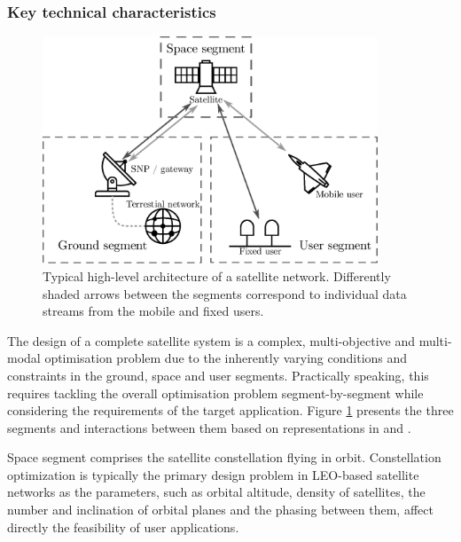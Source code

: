 \documentclass[english, 12pt, a4paper, elec, utf8, a-1b, online]{aaltothesis}
\begin{document}
\subsubsection{Key technical characteristics} \label{ch-constellation-characteristics}

\begin{figure}[h]
  \centering
  \includegraphics[width=100mm]{figures/fig-constellation-segments.eps}
  \caption{Typical high-level architecture of a satellite network. Differently shaded arrows between the segments correspond to individual data streams from the mobile and fixed users.}
  \label{fig-constellation-segments}
\end{figure}

The design of a complete satellite system is a complex, multi-objective and multi-modal optimisation problem due to the inherently varying conditions and constraints in the ground, space and user segments.
Practically speaking, this requires tackling the overall optimisation problem segment-by-segment while considering the requirements of the target application.
Figure \ref{fig-constellation-segments} presents the three segments and interactions between them based on representations in \cite{euspa-secure-satcom-2023} and \cite{celikbilek2022survey}.

Space segment comprises the satellite constellation flying in orbit.
Constellation optimization is typically the primary design problem in LEO-based satellite networks as the parameters, such as orbital altitude, density of satellites, the number and inclination of orbital planes and the phasing between them, affect directly the feasibility of user applications.%
\end{document}

